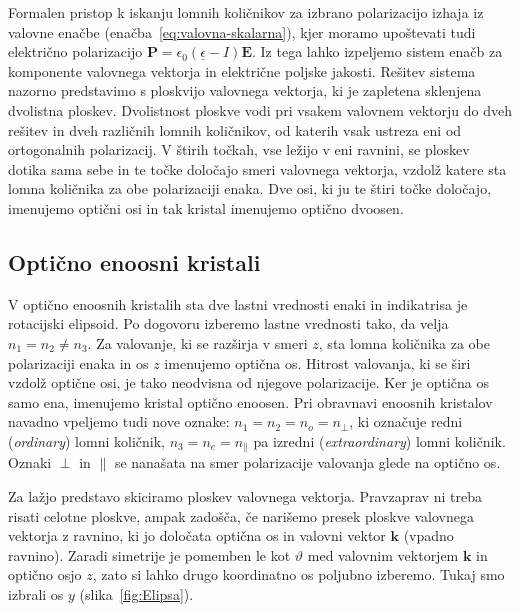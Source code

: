 \begin{remark}
 Formalen pristop k iskanju lomnih količnikov za izbrano polarizacijo izhaja iz valovne enačbe
(enačba~\ref{eq:valovna-skalarna}), kjer moramo upoštevati tudi električno polarizacijo $\mathbf{P} = 
\epsilon_{0}(\underline{\epsilon}-I)\mathbf{E}$. Iz tega lahko izpeljemo sistem enačb za
komponente valovnega vektorja in električne poljske jakosti. Rešitev sistema nazorno predstavimo 
s ploskvijo valovnega vektorja, ki je zapletena sklenjena dvolistna ploskev. Dvolistnost ploskve
vodi pri vsakem valovnem vektorju do dveh  rešitev in dveh različnih lomnih
 količnikov, od katerih vsak ustreza eni od ortogonalnih polarizacij. V štirih točkah, vse ležijo v eni ravnini, 
 se ploskev dotika sama sebe in te točke določajo smeri valovnega vektorja, vzdolž katere sta 
 lomna količnika za obe polarizaciji enaka. Dve osi, ki ju te štiri točke določajo, imenujemo 
 optični osi in tak kristal imenujemo optično dvoosen.
\end{remark}


\subsection*{Optično enoosni kristali}
V optično enoosnih kristalih sta dve lastni vrednosti enaki in indikatrisa je rotacijski 
elipsoid. Po dogovoru izberemo lastne vrednosti tako, da velja $n_{1}=n_{2}\neq n_{3}$. 
Za valovanje, ki se razširja v smeri $z$, sta lomna količnika za obe polarizaciji 
enaka in os $z$ imenujemo optična os. Hitrost valovanja, ki
se širi vzdolž optične osi, je tako neodvisna od njegove polarizacije.
Ker je optična os samo ena, imenujemo kristal optično enoosen. 
Pri obravnavi enoosnih kristalov navadno vpeljemo tudi nove 
oznake: $n_{1}=n_{2}=n_{o}=n_{\perp}$, ki označuje redni (\textit{ordinary})
lomni količnik, $n_{3}=n_{e}=n_\parallel$ pa izredni 
(\textit{extraordinary}) lomni količnik. Oznaki 
$\perp$ in $\parallel$ se nanašata na smer polarizacije valovanja glede na optično os.

Za lažjo predstavo skiciramo ploskev valovnega vektorja. Pravzaprav ni treba risati celotne ploskve, 
ampak zadošča, če narišemo presek ploskve valovnega vektorja z ravnino, ki jo določata 
optična os in valovni vektor $\mathbf{k}$ (vpadno ravnino). 
Zaradi simetrije je pomemben le kot $\vartheta$ med valovnim vektorjem $\mathbf{k}$ 
in optično osjo $z$, zato si lahko drugo koordinatno os poljubno izberemo. Tukaj smo izbrali 
os $y$ (slika~\ref{fig:Elipsa}). 

